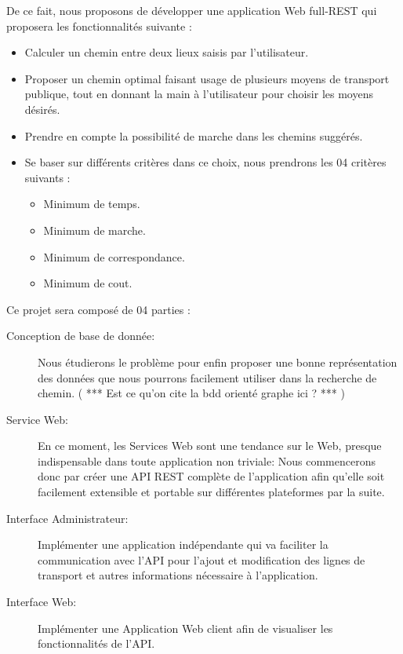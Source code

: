 De ce fait, nous proposons de développer une application Web full-REST qui proposera les fonctionnalités suivante : 

\begin{itemize}
	\item Calculer un chemin entre deux lieux saisis par l'utilisateur.
	\item Proposer un chemin optimal faisant usage de plusieurs moyens de transport publique, tout en donnant la main à l'utilisateur pour choisir les moyens désirés.
	\item Prendre en compte la possibilité de marche dans les chemins suggérés.
	\item Se baser sur différents critères dans ce choix, nous prendrons les 04 critères suivants : 
	\begin{itemize}
		\item Minimum de temps.
		\item Minimum de marche.
		\item Minimum de correspondance.
		\item Minimum de cout.
	\end{itemize}	 
\end{itemize}

Ce projet sera composé de 04 parties :
\begin{description}
	\item[Conception de base de donnée: ] Nous étudierons le problème pour enfin proposer une bonne représentation des données que nous pourrons facilement utiliser dans la recherche de chemin.
	( *** Est ce qu'on cite la bdd orienté graphe ici ? *** )
	
	\item[Service Web: ] En ce moment, les Services Web sont une tendance sur le Web, presque indispensable dans toute application non triviale: Nous commencerons donc par créer une API REST complète de l'application afin qu'elle soit facilement extensible et portable sur différentes plateformes par la suite.
	
	\item[Interface Administrateur: ] Implémenter une application indépendante qui va faciliter la  communication avec l'API pour l'ajout et modification des lignes de transport et autres informations nécessaire à l'application.
	
	
	\item[Interface Web: ] Implémenter une Application Web client afin de visualiser les fonctionnalités de l'API.
\end{description}

